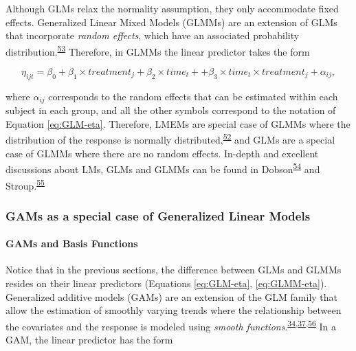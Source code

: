 \documentclass[
]{article}
\begin{document}
Although GLMs relax the normality assumption, they only accommodate fixed effects. Generalized Linear Mixed Models (GLMMs) are an extension of GLMs that incorporate \emph{random effects}, which have an associated probability distribution.\textsuperscript{\protect\hyperlink{ref-mcculloch2001}{53}} Therefore, in GLMMs the linear predictor takes the form

\begin{equation}
\eta_{ijt}=\beta_0+\beta_1 \times treatment_{j} + \beta_2 \times time_{t} + +\beta_3 \times time_{t}\times treatment_{j}+\alpha_{ij},
\label{eq:GLMM-eta}
\end{equation}

where \(\alpha_{ij}\) corresponds to the random effects that can be estimated within each subject in each group, and all the other symbols correspond to the notation of Equation \eqref{eq:GLM-eta}. Therefore, LMEMs are special case of GLMMs where the distribution of the response is normally distributed,\textsuperscript{\protect\hyperlink{ref-nelder1972}{52}} and GLMs are a special case of GLMMs where there are no random effects. In-depth and excellent discussions about LMs, GLMs and GLMMs can be found in Dobson\textsuperscript{\protect\hyperlink{ref-dobson2008}{54}} and Stroup.\textsuperscript{\protect\hyperlink{ref-stroup2013}{55}}

\hypertarget{GAM-theory}{%
\subsubsection{GAMs as a special case of Generalized Linear Models}\label{GAM-theory}}

\hypertarget{gams-and-basis-functions}{%
\paragraph{GAMs and Basis Functions}\label{gams-and-basis-functions}}

Notice that in the previous sections, the difference between GLMs and GLMMs resides on their linear predictors (Equations \eqref{eq:GLM-eta}, \eqref{eq:GLMM-eta}). Generalized additive models (GAMs) are an extension of the GLM family that allow the estimation of smoothly varying trends where the relationship between the covariates and the response is modeled using \emph{smooth functions}.\textsuperscript{\protect\hyperlink{ref-simpson2018}{34},\protect\hyperlink{ref-wood2017}{37},\protect\hyperlink{ref-hastie1987}{56}} In a GAM, the linear predictor has the form
\end{document}
